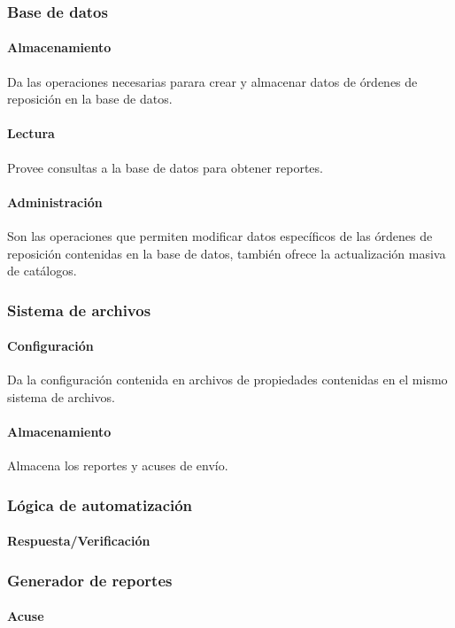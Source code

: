 \subsubsection{Base de datos}
\paragraph{Almacenamiento} Da las operaciones necesarias parara crear y almacenar datos de órdenes de reposición en la base de datos.
\paragraph{Lectura} Provee consultas a la base de datos para obtener reportes.
\paragraph{Administración} Son las operaciones que permiten modificar datos específicos de las órdenes de reposición contenidas en la base de datos, también ofrece la actualización masiva de catálogos.

\subsubsection{Sistema de archivos}
\paragraph{Configuración} Da la configuración contenida en archivos de propiedades contenidas en el mismo sistema de archivos.
\paragraph{Almacenamiento} Almacena los reportes y acuses de envío.

\subsubsection{Lógica de automatización}
\paragraph{Respuesta/Verificación}


\subsubsection{Generador de reportes}
\paragraph{Acuse}
